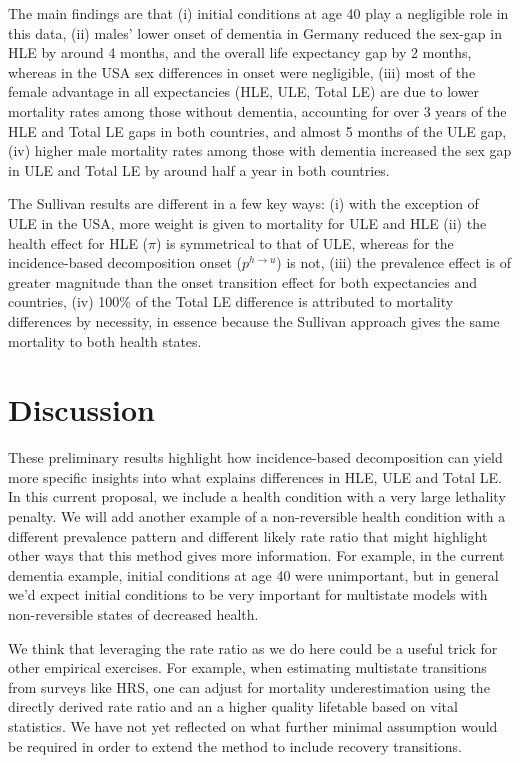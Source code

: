 \documentclass[sn-apa]{sn-jnl}%
\theoremstyle{thmstyleone}%
\theoremstyle{thmstyletwo}%
\theoremstyle{thmstylethree}%
\begin{document}
The main findings are that (i) initial conditions at age 40 play a negligible role in this data, (ii) males' lower onset of dementia in Germany reduced the sex-gap in HLE by around 4 months, and the overall life expectancy gap by 2 months, whereas in the USA sex differences in onset were negligible, (iii) most of the female advantage in all expectancies (HLE, ULE, Total LE) are due to lower mortality rates among those without dementia, accounting for over 3 years of the HLE and Total LE gaps in both countries, and almost 5 months of the ULE gap, (iv) higher male mortality rates among those with dementia increased the sex gap in ULE and Total LE by around half a year in both countries.

The Sullivan results are different in a few key ways: (i) with the exception of ULE in the USA, more weight is given to mortality for ULE and HLE (ii) the health effect for HLE ($\pi$) is symmetrical to that of ULE, whereas for the incidence-based decomposition onset ($p^{h\rightarrow u}$)  is not, (iii) the prevalence effect is of greater magnitude than the onset transition effect for both expectancies and countries, (iv) 100\% of the Total LE difference is attributed to mortality differences by necessity, in essence because the Sullivan approach gives the same mortality to both health states.

\section{Discussion}
These preliminary results highlight how incidence-based decomposition can yield more specific insights into what explains differences in HLE, ULE and Total LE. In this current proposal, we include a health condition with a very large lethality penalty. We will add another example of a non-reversible health condition with a different prevalence pattern and different likely rate ratio that might highlight other ways that this method gives more information. For example, in the current dementia example, initial conditions at age 40 were unimportant, but in general we'd expect initial conditions to be very important for multistate models with non-reversible states of decreased health.

We think that leveraging the rate ratio as we do here could be a useful trick for other empirical exercises. For example, when estimating multistate transitions from surveys like HRS, one can adjust for mortality underestimation using the directly derived rate ratio and an a higher quality lifetable based on vital statistics. We have not yet reflected on what further minimal assumption would be required in order to extend the method to include recovery transitions.
\end{document}
